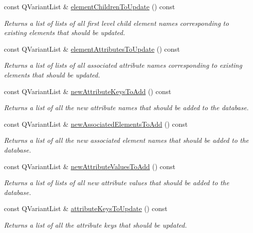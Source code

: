 \begin{DoxyCompactItemize}
const \-Q\-Variant\-List \& \hyperlink{class_g_c_batch_processor_helper_a8fd4cac8af9a54df52a98628d5ba6fbe}{element\-Children\-To\-Update} () const 
\begin{DoxyCompactList}\small\item\em \-Returns a list of lists of all first level child element names corresponding to existing elements that should be updated. \end{DoxyCompactList}\item 
const \-Q\-Variant\-List \& \hyperlink{class_g_c_batch_processor_helper_a3b0630e9e210b2b86e58cb43d3706b73}{element\-Attributes\-To\-Update} () const 
\begin{DoxyCompactList}\small\item\em \-Returns a list of lists of all associated attribute names corresponding to existing elements that should be updated. \end{DoxyCompactList}\item 
const \-Q\-Variant\-List \& \hyperlink{class_g_c_batch_processor_helper_a605ca53123f28467df39cabeb3aa65cd}{new\-Attribute\-Keys\-To\-Add} () const 
\begin{DoxyCompactList}\small\item\em \-Returns a list of all the new attribute names that should be added to the database. \end{DoxyCompactList}\item 
const \-Q\-Variant\-List \& \hyperlink{class_g_c_batch_processor_helper_abf195046fd00e629b2ce5e3bd6bcf90d}{new\-Associated\-Elements\-To\-Add} () const 
\begin{DoxyCompactList}\small\item\em \-Returns a list of all the new associated element names that should be added to the database. \end{DoxyCompactList}\item 
const \-Q\-Variant\-List \& \hyperlink{class_g_c_batch_processor_helper_af06d87d433f9402667f1cd654ad4b422}{new\-Attribute\-Values\-To\-Add} () const 
\begin{DoxyCompactList}\small\item\em \-Returns a list of lists of all new attribute values that should be added to the database. \end{DoxyCompactList}\item 
const \-Q\-Variant\-List \& \hyperlink{class_g_c_batch_processor_helper_a4cad81bffaa5af1531a72ccaeaedd600}{attribute\-Keys\-To\-Update} () const 
\begin{DoxyCompactList}\small\item\em \-Returns a list of all the attribute keys that should be updated. \end{DoxyCompactList}\item 

\end{DoxyCompactItemize}
